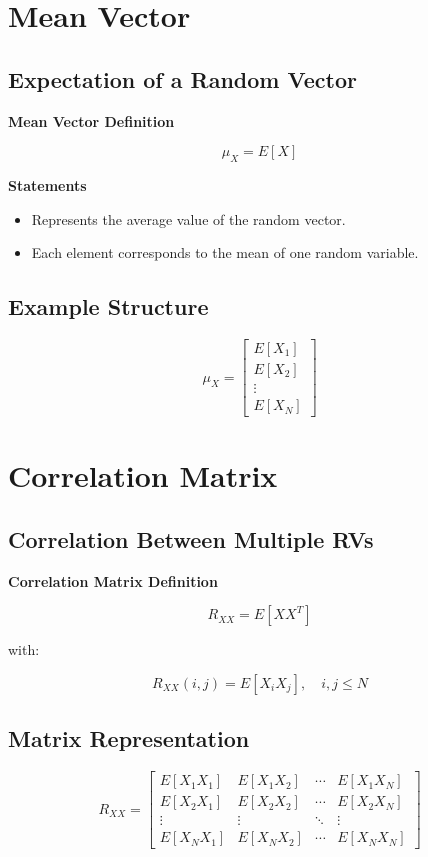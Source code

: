 \documentclass[12pt]{article}
\begin{document}
\section{Mean Vector}

\subsection{Expectation of a Random Vector}

\textbf{Mean Vector Definition}

\[
\mu_X = E[X]
\]

\textbf{Statements}
\begin{itemize}
\item Represents the average value of the random vector.
\item Each element corresponds to the mean of one random variable.
\end{itemize}

\subsection{Example Structure}

\[
\mu_X =
\begin{bmatrix}
E[X_1] \\
E[X_2] \\
\vdots \\
E[X_N]
\end{bmatrix}
\]

\section{Correlation Matrix}

\subsection{Correlation Between Multiple RVs}

\textbf{Correlation Matrix Definition}

\[
R_{XX} = E[XX^T]
\]

with:

\[
R_{XX}(i,j) = E[X_i X_j], \quad i, j \leq N
\]

\subsection{Matrix Representation}

\[
R_{XX} =
\begin{bmatrix}
E[X_1X_1] & E[X_1X_2] & \cdots & E[X_1X_N] \\
E[X_2X_1] & E[X_2X_2] & \cdots & E[X_2X_N] \\
\vdots & \vdots & \ddots & \vdots \\
E[X_NX_1] & E[X_NX_2] & \cdots & E[X_NX_N]
\end{bmatrix}
\]
\end{document}
